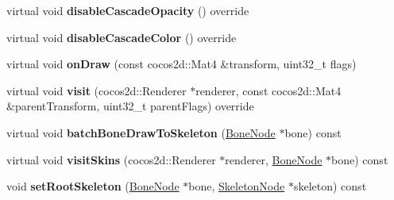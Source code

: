 \begin{DoxyCompactItemize}
virtual void {\bfseries disable\+Cascade\+Opacity} () override
\item 
\mbox{\label{classBoneNode_af5fc818728f65ad394f8640f63aa3534}} 
virtual void {\bfseries disable\+Cascade\+Color} () override
\item 
\mbox{\label{classBoneNode_af05b2a7a486927bba7ca22d90947f370}} 
virtual void {\bfseries on\+Draw} (const cocos2d\+::\+Mat4 \&transform, uint32\+\_\+t flags)
\item 
\mbox{\label{classBoneNode_a72766a5f659139c68604abdfa1b527c8}} 
virtual void {\bfseries visit} (cocos2d\+::\+Renderer $\ast$renderer, const cocos2d\+::\+Mat4 \&parent\+Transform, uint32\+\_\+t parent\+Flags) override
\item 
\mbox{\label{classBoneNode_a7b9f48a08d7c6bbf80dbaef2c8deeda4}} 
virtual void {\bfseries batch\+Bone\+Draw\+To\+Skeleton} (\hyperlink{classBoneNode}{Bone\+Node} $\ast$bone) const
\item 
\mbox{\label{classBoneNode_ae4b2f8b9edcb1168a5710e484c00d4b7}} 
virtual void {\bfseries visit\+Skins} (cocos2d\+::\+Renderer $\ast$renderer, \hyperlink{classBoneNode}{Bone\+Node} $\ast$bone) const
\item 
\mbox{\label{classBoneNode_aaba98257bace256f845607bbf9d0e329}} 
void {\bfseries set\+Root\+Skeleton} (\hyperlink{classBoneNode}{Bone\+Node} $\ast$bone, \hyperlink{classSkeletonNode}{Skeleton\+Node} $\ast$skeleton) const
\end{DoxyCompactItemize}

